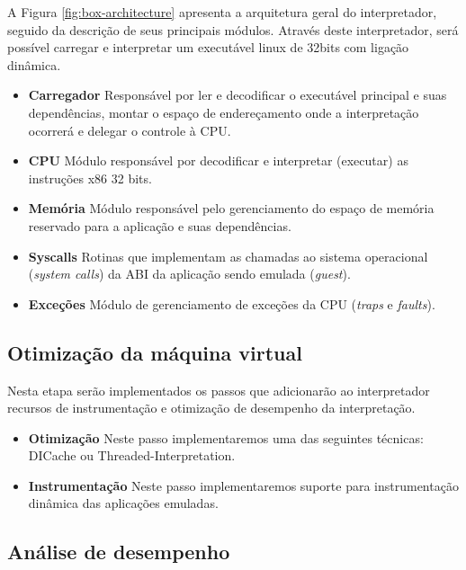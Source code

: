 \documentclass[11pt,twoside]{article}
\begin{document}
A Figura \ref{fig:box-architecture} apresenta a arquitetura geral do interpretador, seguido da descrição de seus principais módulos.
Através deste interpretador, será possível carregar e interpretar um executável linux de 32bits com ligação dinâmica.

\begin{itemize}
 \item \textbf{Carregador} Responsável por ler e decodificar o executável principal e suas dependências, montar o espaço de endereçamento onde a interpretação ocorrerá e delegar o controle à CPU.
 \item \textbf{CPU} Módulo responsável por decodificar e interpretar (executar) as instruções x86 32 bits.
 \item \textbf{Memória} Módulo responsável pelo gerenciamento do espaço de memória reservado para a aplicação e suas dependências.
 \item \textbf{Syscalls} Rotinas que implementam as chamadas ao sistema operacional (\emph{system calls}) da ABI da aplicação sendo emulada (\emph{guest}).
 \item \textbf{Exceções} Módulo de gerenciamento de exceções da CPU (\emph{traps} e \emph{faults}).
\end{itemize}

\subsection{Otimização da máquina virtual}

Nesta etapa serão implementados os passos que adicionarão ao interpretador recursos de instrumentação e otimização de desempenho da interpretação.

\begin{itemize}
 \item \textbf{Otimização} Neste passo implementaremos uma das seguintes técnicas: DICache\cite{Chen2012} ou Threaded-Interpretation\cite{Klint1981}.
 \item \textbf{Instrumentação} Neste passo implementaremos suporte para instrumentação dinâmica das aplicações emuladas.
\end{itemize}
 
\subsection{Análise de desempenho}
\end{document}
